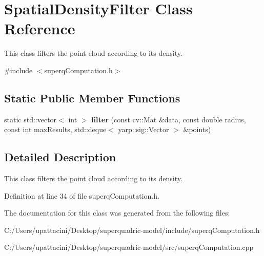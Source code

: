 \section{Spatial\+Density\+Filter Class Reference}
\label{classSpatialDensityFilter}


This class filters the point cloud according to its density.  




{\ttfamily \#include $<$superq\+Computation.\+h$>$}

\subsection*{Static Public Member Functions}
\begin{DoxyCompactItemize}
\item 
\mbox{\label{classSpatialDensityFilter_a85931f42a6e96af8c7f331fbd01c15bf}} 
static std\+::vector$<$ int $>$ {\bfseries filter} (const cv\+::\+Mat \&data, const double radius, const int max\+Results, std\+::deque$<$ yarp\+::sig\+::\+Vector $>$ \&points)
\end{DoxyCompactItemize}


\subsection{Detailed Description}
This class filters the point cloud according to its density. 

Definition at line 34 of file superq\+Computation.\+h.



The documentation for this class was generated from the following files\+:\begin{DoxyCompactItemize}
\item 
C\+:/\+Users/upattacini/\+Desktop/superquadric-\/model/include/superq\+Computation.\+h\item 
C\+:/\+Users/upattacini/\+Desktop/superquadric-\/model/src/superq\+Computation.\+cpp\end{DoxyCompactItemize}
